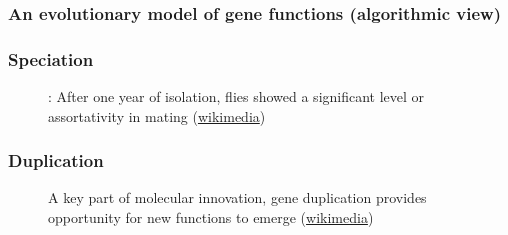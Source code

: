 \documentclass[aspectratio=169, 10pt]{beamer}\usepackage[]{graphicx}\usepackage[]{color}
\begin{document}
\begin{frame}[label=aphyloalgorithmicview]
\frametitle{An evolutionary model of gene functions (algorithmic view)}

\footnotesize

\begin{algorithm}[H]
\SetAlgoLined
{}
{}
\end{algorithm}

\hyperlink{aphylographicalviewcont}{}

\normalsize
\end{frame}

\begin{frame}[label = duplicationvsspeciation]
\frametitle{Speciation}
\begin{figure}
\centering
\def\svgwidth{.8\linewidth}
\tiny

\caption{: After one year of isolation, flies showed a significant level or assortativity in mating (\href{https://commons.wikimedia.org/wiki/File:Drosophila_speciation_experiment.svg}{wikimedia})}
\end{figure}

\hyperlink{aphylographicalviewcont}{}

\end{frame}

\begin{frame}
\frametitle{Duplication}
\begin{figure}
\centering
\def\svgwidth{.6\linewidth}
\tiny

\caption{A key part of molecular innovation, gene duplication provides opportunity for new functions to emerge (\href{https://en.wikipedia.org/wiki/File:Evolution_fate_duplicate_genes_-_vector.svg}{wikimedia})}
\end{figure}

\hyperlink{aphylographicalviewcont}{}

\end{frame}
\end{document}
